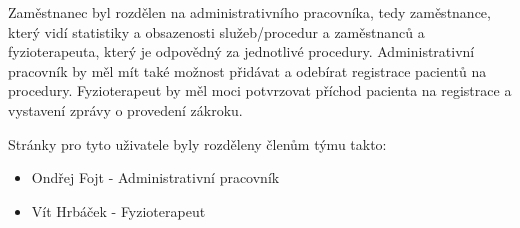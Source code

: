 Zaměstnanec byl rozdělen na administrativního pracovníka, tedy zaměstnance, který vidí statistiky a obsazenosti služeb/procedur a zaměstnanců
a fyzioterapeuta, který je odpovědný za jednotlivé procedury.
Administrativní pracovník by měl mít také možnost přidávat a odebírat registrace pacientů na procedury.
Fyzioterapeut by měl moci potvrzovat příchod pacienta na registrace a vystavení zprávy o provedení zákroku.

Stránky pro tyto uživatele byly rozděleny členům týmu takto:
\begin{itemize}
    \item Ondřej Fojt - Administrativní pracovník
    \item Vít Hrbáček - Fyzioterapeut
\end{itemize}

\newpage
